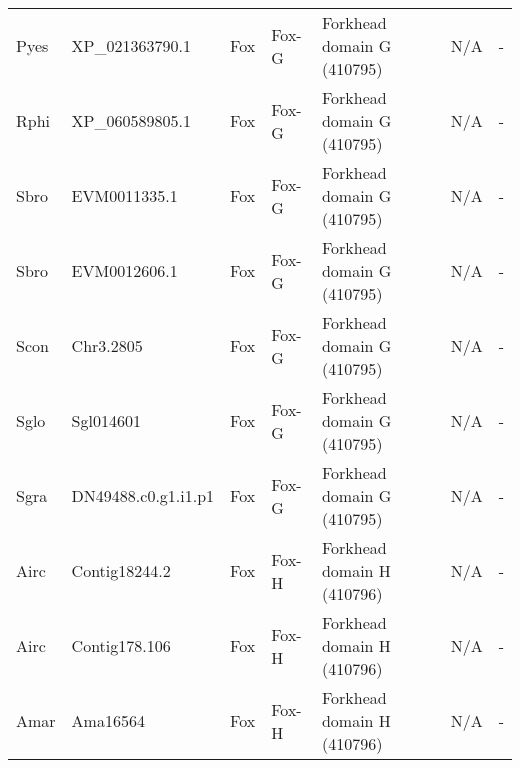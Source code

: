 \documentclass[../main.tex]{subfiles}
\begin{document}
\begin{landscape}
\begin{longtable}{lllllll}
		Pyes           & XP\_021363790.1       & Fox            & Fox-G               & Forkhead domain G (410795)                  & N/A                                                                    & -                    \\
		Rphi           & XP\_060589805.1       & Fox            & Fox-G               & Forkhead domain G (410795)                  & N/A                                                                    & -                    \\
		Sbro           & EVM0011335.1          & Fox            & Fox-G               & Forkhead domain G (410795)                  & N/A                                                                    & -                    \\
		Sbro           & EVM0012606.1          & Fox            & Fox-G               & Forkhead domain G (410795)                  & N/A                                                                    & -                    \\
		Scon           & Chr3.2805             & Fox            & Fox-G               & Forkhead domain G (410795)                  & N/A                                                                    & -                    \\
		Sglo           & Sgl014601             & Fox            & Fox-G               & Forkhead domain G (410795)                  & N/A                                                                    & -                    \\
		Sgra           & DN49488.c0.g1.i1.p1   & Fox            & Fox-G               & Forkhead domain G (410795)                  & N/A                                                                    & -                    \\
		Airc           & Contig18244.2         & Fox            & Fox-H               & Forkhead domain H (410796)                  & N/A                                                                    & -                    \\
		Airc           & Contig178.106         & Fox            & Fox-H               & Forkhead domain H (410796)                  & N/A                                                                    & -                    \\
		Amar           & Ama16564              & Fox            & Fox-H               & Forkhead domain H (410796)                  & N/A                                                                    & -                    \\

\end{longtable}
\end{landscape}
\end{document}
